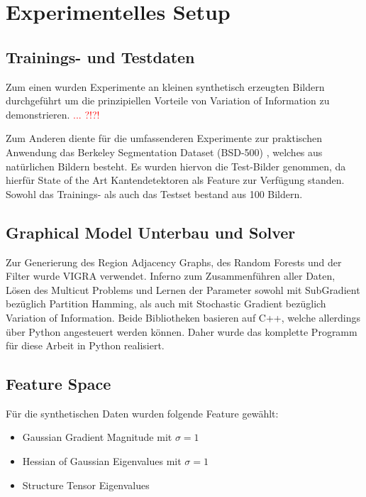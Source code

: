 \chapter{Experimentelles Setup}\label{ch:mathtest} %

\section{Trainings- und Testdaten}

Zum einen wurden Experimente an kleinen synthetisch erzeugten Bildern durchgeführt um die prinzipiellen Vorteile von Variation of Information zu demonstrieren. \textcolor{red}{... ?!?!}

Zum Anderen diente für die umfassenderen Experimente zur praktischen Anwendung das Berkeley Segmentation Dataset (BSD-500) \cite{BSD}, welches aus natürlichen Bildern besteht. Es wurden hiervon die Test-Bilder genommen, da hierfür State of the Art Kantendetektoren als Feature zur Verfügung standen. Sowohl das Trainings- als auch das Testset bestand aus 100 Bildern.


\section{Graphical Model Unterbau und Solver}


Zur Generierung des Region Adjacency Graphs, des Random Forests und der Filter wurde VIGRA \cite{VIGRA} verwendet. Inferno \cite{Inferno} zum Zusammenführen aller Daten, Lösen des Multicut Problems und Lernen der Parameter sowohl mit SubGradient bezüglich Partition Hamming, als auch mit Stochastic Gradient bezüglich Variation of Information. Beide Bibliotheken basieren auf C++, welche allerdings über Python angesteuert werden können. Daher wurde das komplette Programm für diese Arbeit in Python realisiert.



\section{Feature Space}

Für die synthetischen Daten wurden folgende Feature gewählt:
\begin{itemize}
	\item Gaussian Gradient Magnitude mit $\sigma=1$
	\item Hessian of Gaussian Eigenvalues mit $\sigma=1$
	\item Structure Tensor Eigenvalues
\end{itemize}

